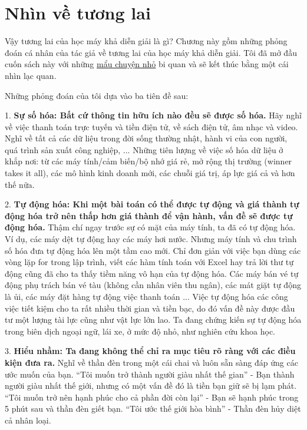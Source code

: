 \chapter{Nhìn về tương lai}
Vậy tương lai của học máy khả diễn giải là gì? Chương này gồm những phỏng đoán cá nhân của tác giả về tương lai của học máy khả diễn giải. Tôi đã mở đầu cuốn sách này với những \href{}{mẩu chuyện nhỏ} bi quan và sẽ kết thúc bằng một cái nhìn lạc quan.

Những phỏng đoán của tôi dựa vào ba tiên đề sau:

1. \textbf{Sự số hóa: Bất cứ thông tin hữu ích nào đều sẽ được số hóa.} Hãy nghĩ về việc thanh toán trực tuyến và tiền điện tử, về sách điện tử, âm nhạc và video. Nghĩ về tất cả các dữ liệu trong đời sống thường nhật, hành vi của con người, quá trình sản xuất công nghiệp, ... Những tiên lượng về việc số hóa dữ liệu ở khắp nơi: từ các máy tính/cảm biến/bộ nhớ giá rẻ, mở rộng thị trường (winner takes it all), các mô hình kinh doanh mới, các chuỗi giá trị, áp lực giá cả và hơn thế nữa.

2. \textbf{Tự động hóa: Khi một bài toán có thể được tự động và giá thành tự động hóa trở nên thấp hơn giá thành để vận hành, vấn đề sẽ được tự động hóa.} Thậm chí ngay trước sự có mặt của máy tính, ta đã có tự động hóa. Ví dụ, các máy dệt tự động hay các máy hơi nước. Nhưng máy tính và chu trình số hóa đưa tự động hóa lên một tầm cao mới. Chỉ đơn giản với việc bạn dùng các vòng lặp for trong lập trình, viết các hàm tính toán với Excel hay trả lời thư tự động cũng đã cho ta thấy tiềm năng vô hạn của tự động hóa. Các máy bán vé tự động phụ trách bán vé tàu (không cần nhân viên thu ngân), các mát giặt tự động là ủi, các máy đặt hàng tự động việc thanh toán ... Việc tự động hóa các công việc tiết kiệm cho ta rất nhiều thời gian và tiền bạc, do đó vấn đề này được đầu tư một lượng tài lực cũng như vật lực lớn lao. Ta đang chứng kiến sự tự động hóa trong biên dịch ngoại ngữ, lái xe, ở mức độ nhỏ, như nghiên cứu khoa học.

3. \textbf{Hiểu nhầm: Ta đang không thể chỉ ra mục tiêu rõ ràng với các điều kiện đưa ra.} Nghĩ về thần đèn trong một cái chai và luôn sẵn sàng đáp ứng các ước muốn của bạn. ``Tôi muốn trở thành người giàu nhất thế gian'' - Bạn thành người giàu nhất thế giới, nhưng có một vấn đề đó là tiền bạn giữ sẽ bị lạm phát. ``Tôi muốn trở nên hạnh phúc cho cả phần đời còn lại'' - Bạn sẽ hạnh phúc trong 5 phút sau và thần đèn giết bạn. ``Tôi ước thế giới hòa bình'' - Thần đèn hủy diệt cả nhân loại. 


